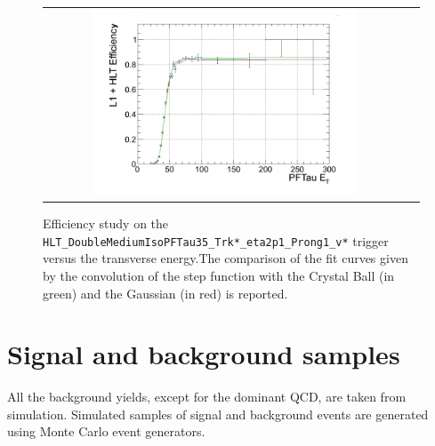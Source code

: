  	\begin{figure}[tbh!]
	\centering
	\begin{tabular}{cc}
		\includegraphics[width=0.75\textwidth]{analysis/pics/trigger_turnon.png}
	\end{tabular}
	\caption{Efficiency study on the \texttt{HLT\_\-DoubleMedium\-IsoPFTau35\_\-Trk*\_\-eta2p1\_\-Prong1\_\-v*} trigger versus the \hadtau transverse energy.The comparison of the fit curves given by the convolution of the step function with the Crystal Ball (in green) and the Gaussian (in red) is reported\cite{bib:dthesis:riccardoManzoni}.}
	\label{fig::trigger_turnon}
\end{figure}

\section{Signal and background samples}



All the background yields, except for the dominant QCD, are taken from simulation. Simulated samples of signal and background events are generated using Monte Carlo event generators.

